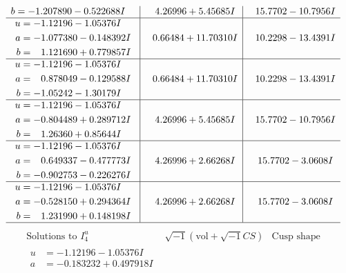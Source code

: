 \documentclass[1p]{elsarticle_modified}
\theoremstyle{definition}
\newcommand{\I}{\sqrt{-1}}
\begin{document}
$$\begin{array}{c|c|c}
\begin{aligned}
b &= -1.207890 - 0.522688 I\end{aligned}
 & \phantom{-}4.26996 + 5.45685 I & \phantom{-}15.7702 - 10.7956 I \\ \hline\begin{aligned}
u &= -1.12196 - 1.05376 I \\
a &= -1.077380 - 0.148392 I \\
b &= \phantom{-}1.121690 + 0.779857 I\end{aligned}
 & \phantom{-}0.66484 + 11.70310 I & \phantom{-}10.2298 - 13.4391 I \\ \hline\begin{aligned}
u &= -1.12196 - 1.05376 I \\
a &= \phantom{-}0.878049 - 0.129588 I \\
b &= -1.05242 - 1.30179 I\end{aligned}
 & \phantom{-}0.66484 + 11.70310 I & \phantom{-}10.2298 - 13.4391 I \\ \hline\begin{aligned}
u &= -1.12196 - 1.05376 I \\
a &= -0.804489 + 0.289712 I \\
b &= \phantom{-}1.26360 + 0.85644 I\end{aligned}
 & \phantom{-}4.26996 + 5.45685 I & \phantom{-}15.7702 - 10.7956 I \\ \hline\begin{aligned}
u &= -1.12196 - 1.05376 I \\
a &= \phantom{-}0.649337 - 0.477773 I \\
b &= -0.902753 - 0.226276 I\end{aligned}
 & \phantom{-}4.26996 + 2.66268 I & \phantom{-}15.7702 - 3.0608 I \\ \hline\begin{aligned}
u &= -1.12196 - 1.05376 I \\
a &= -0.528150 + 0.294364 I \\
b &= \phantom{-}1.231990 + 0.148198 I\end{aligned}
 & \phantom{-}4.26996 + 2.66268 I & \phantom{-}15.7702 - 3.0608 I\\
 \hline 
 \end{array}$$\newpage$$\begin{array}{c|c|c}  
\text{Solutions to }I^u_{4}& \I (\text{vol} + \sqrt{-1}CS) & \text{Cusp shape}\\
 \hline 
\begin{aligned}
u &= -1.12196 - 1.05376 I \\
a &= -0.183232 + 0.497918 I \\

\end{aligned}
\end{array}$$
\end{document}
